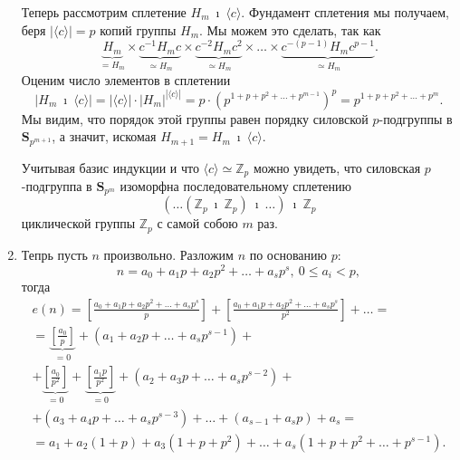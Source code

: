 \documentclass{article}
\begin{document}
\begin{enumerate}
    Теперь рассмотрим сплетение $H_m \ \imath \ \langle c \rangle$. Фундамент сплетения мы получаем, беря $|\langle c \rangle| = p$ копий группы $H_m$. Мы можем это сделать, так как $$ \underbrace{H_m}_{=H_m} \times \underbrace{c^{-1} H_m c}_{\simeq H_m} \times \underbrace{c^{-2} H_m c^2}_{\simeq H_m} \times \ldots \times \underbrace{c^{-(p-1)} H_m c^{p-1}}_{\simeq H_m}. $$
    Оценим число элементов в сплетении
    \[
        |H_m \ \imath \ \langle c \rangle| = |\langle c \rangle| \cdot |H_m|^{| \langle c \rangle |} = p \cdot (p^{1 + p + p^2 + \ldots + p^{m - 1}})^p = p^{1 + p + p^2 + \ldots + p^m}.
    \]
    Мы видим, что порядок этой группы равен порядку силовской $p$-подгруппы в $\mathbf{S}_{p^{m + 1}}$, а значит, искомая $H_{m + 1} = H_m \ \imath \ \langle c \rangle$.

    Учитывая базис индукции и что $\langle c \rangle \simeq \mathbb{Z}_p$ можно увидеть, что силовская $p$-подгруппа в $\mathbf{S}_{p^m}$ изоморфна последовательному сплетению
    \[
        \left( \ldots \left( \mathbb{Z}_p \ \imath \ \mathbb{Z}_p \right) \ \imath \ \ldots \right) \ \imath \ \mathbb{Z}_p
    \]
    циклической группы $\mathbb{Z}_p$ с самой собою $m$ раз.

    \item Тепрь пусть $n$ произвольно. Разложим $n$ по основанию $p$: 
    \begin{equation} \label{eq_156}
        n = a_0 + a_1 p + a_2 p^2 + \ldots + a_s p^s, \ 0 \leqslant a_i < p,
    \end{equation} тогда
    \begin{multline*}
        e(n) = \left[ \frac{a_0 + a_1 p + a_2 p^2 + \ldots + a_s p^s}{p} \right] + \left[ \frac{a_0 + a_1 p + a_2 p^2 + \ldots + a_s p^s}{p^2} \right] + \ldots = \\
        = \underbrace{\left[ \frac{a_0}{p} \right]}_{ = 0} + (a_1 + a_2p + \ldots + a_s p^{s - 1}) + \\
        + \underbrace{\left[ \frac{a_0}{p^2} \right]}_{=0} + \underbrace{\left[ \frac{a_1 p}{p^2} \right]}_{=0} + (a_2 + a_3 p + \ldots + a_s p^{s-2}) + \\
        + (a_3 + a_4p + \ldots + a_s p^{s - 3}) + \ldots + (a_{s - 1} + a_s p) + a_s = \\
        = a_1 + a_2(1 + p) + a_3(1 + p + p^2) + \ldots + a_s(1 + p + p^2 + \ldots + p^{s - 1}).
    \end{multline*}


\end{enumerate}
\end{document}
